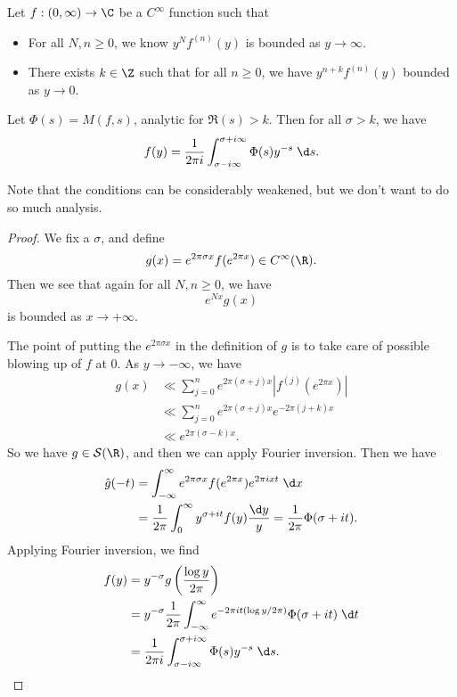 \documentclass[a4paper]{article}
\begin{document}
\begin{thm}
  Let $f: (0, \infty) \to \C$ be a $C^\infty$ function such that
  \begin{itemize}
    \item For all $N, n \geq 0$, we know $y^N f^{(n)}(y)$ is bounded as $y \to \infty$.
    \item There exists $k \in \Z$ such that for all $n \geq 0$, we have $y^{n + k} f^{(n)}(y)$ bounded as $y \to 0$.
  \end{itemize}
  Let $\Phi(s) = M(f, s)$, analytic for $\Re(s) > k$. Then for all $\sigma > k$, we have
  \[
    f(y) = \frac{1}{2\pi i} \int_{\sigma - i \infty}^{\sigma + i \infty} \Phi(s) y^{-s} \;\d s.
  \]
\end{thm}
Note that the conditions can be considerably weakened, but we don't want to do so much analysis.

\begin{proof}
  We fix a $\sigma$, and define
  \[
    g(x) = e^{2\pi \sigma x} f(e^{2\pi x}) \in C^\infty(\R).
  \]
  Then we see that again for all $N, n \geq 0$, we have
  \[
    e^{Nx} g(x)
  \]
  is bounded as $x \to +\infty$.

  The point of putting the $e^{2\pi \sigma x}$ in the definition of $g$ is to take care of possible blowing up of $f$ at $0$. As $y \to -\infty$, we have
  \begin{align*}
    g(x) &\ll \sum_{j = 0}^n e^{2\pi (\sigma + j)x}|f^{(j)} (e^{2\pi x})| \\
    &\ll \sum_{j = 0}^n e^{2\pi (\sigma + j)x} e^{-2\pi (j + k) x}\\
    &\ll e^{2\pi (\sigma - k)x}.
  \end{align*}
  So we have $g \in \mathcal{S}(\R)$, and then we can apply Fourier inversion. Then we have
  \begin{align*}
    \hat{g}(-t) &= \int_{-\infty}^\infty e^{2\pi \sigma x} f(e^{2\pi x}) e^{2\pi i x t}\;\d x\\
    &= \frac{1}{2\pi} \int_0^\infty y^{\sigma + it} f(y) \frac{\d y}{y} = \frac{1}{2\pi} \Phi(\sigma + it).
  \end{align*}
  Applying Fourier inversion, we find
  \begin{align*}
    f(y) &= y^{-\sigma} g\left(\frac{\log y}{2\pi}\right)\\
    &= y^{-\sigma} \frac{1}{2\pi} \int_{-\infty}^\infty e^{-2\pi i t (\log y / 2\pi)}\Phi(\sigma + it) \;\d t\\
    &= \frac{1}{2\pi i}\int_{\sigma - i \infty}^{\sigma + i \infty} \Phi(s) y^{-s}\;\d s.
  \end{align*}
\end{proof}
\end{document}
